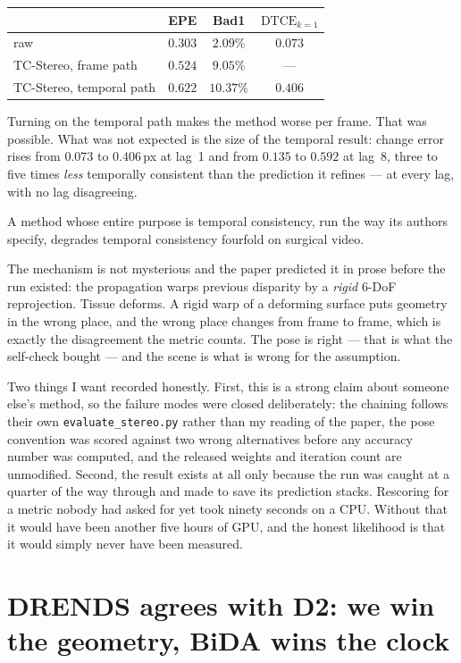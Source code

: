 \documentclass[11pt,a4paper]{article}
\begin{document}
\begin{center}
\begin{tabular}{lccc}
\toprule
& EPE & Bad1 & $\mathrm{DTCE}_{k=1}$ \\
\midrule
raw & $0.303$ & $2.09\%$ & $0.073$ \\
TC-Stereo, frame path & $0.524$ & $9.05\%$ & --- \\
TC-Stereo, temporal path & $0.622$ & $10.37\%$ & $0.406$ \\
\bottomrule
\end{tabular}
\end{center}

Turning on the temporal path makes the method worse per frame. That was possible.
What was not expected is the size of the temporal result: change error rises from
$0.073$ to $0.406$\,px at lag~1 and from $0.135$ to $0.592$ at lag~8, three to five
times \emph{less} temporally consistent than the prediction it refines --- at every
lag, with no lag disagreeing.

A method whose entire purpose is temporal consistency, run the way its authors
specify, degrades temporal consistency fourfold on surgical video.

The mechanism is not mysterious and the paper predicted it in prose before the run
existed: the propagation warps previous disparity by a \emph{rigid} $6$-DoF
reprojection. Tissue deforms. A rigid warp of a deforming surface puts geometry in
the wrong place, and the wrong place changes from frame to frame, which is exactly
the disagreement the metric counts. The pose is right --- that is what the
self-check bought --- and the scene is what is wrong for the assumption.

Two things I want recorded honestly. First, this is a strong claim about someone
else's method, so the failure modes were closed deliberately: the chaining follows
their own \texttt{evaluate\_stereo.py} rather than my reading of the paper, the
pose convention was scored against two wrong alternatives before any accuracy
number was computed, and the released weights and iteration count are unmodified.
Second, the result exists at all only because the run was caught at a quarter of
the way through and made to save its prediction stacks. Rescoring for a metric
nobody had asked for yet took ninety seconds on a CPU. Without that it would have
been another five hours of GPU, and the honest likelihood is that it would simply
never have been measured.


\section*{DRENDS agrees with D2: we win the geometry, BiDA wins the clock}
\end{document}
